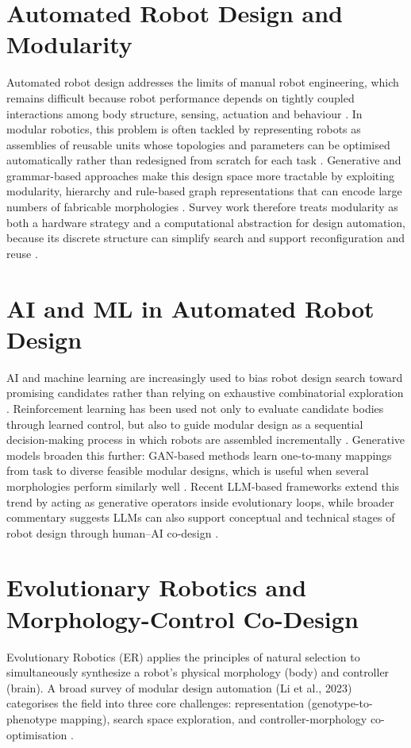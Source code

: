 \documentclass[12pt,a4paper]{report}
\begin{document}
\section{Automated Robot Design and Modularity}
Automated robot design addresses the limits of manual robot engineering, which remains difficult because robot performance depends on tightly coupled interactions among body structure, sensing, actuation and behaviour \citep{matthews2023efficient,park2021computational}. In modular robotics, this problem is often tackled by representing robots as assemblies of reusable units whose topologies and parameters can be optimised automatically rather than redesigned from scratch for each task \citep{li2023modular,hu2022modular}. Generative and grammar-based approaches make this design space more tractable by exploiting modularity, hierarchy and rule-based graph representations that can encode large numbers of fabricable morphologies \citep{hornby2003generative,zhao2020robogrammar}. Survey work therefore treats modularity as both a hardware strategy and a computational abstraction for design automation, because its discrete structure can simplify search and support reconfiguration and reuse \citep{li2023modular,alattas2019evolutionary}.

\section{AI and ML in Automated Robot Design}
AI and machine learning are increasingly used to bias robot design search toward promising candidates rather than relying on exhaustive combinatorial exploration \citep{qiu2024robomorph,11003187}. Reinforcement learning has been used not only to evaluate candidate bodies through learned control, but also to guide modular design as a sequential decision-making process in which robots are assembled incrementally \citep{qiu2024robomorph,park2021computational}. Generative models broaden this further: GAN-based methods learn one-to-many mappings from task to diverse feasible modular designs, which is useful when several morphologies perform similarly well \citep{hu2022modular}. Recent LLM-based frameworks extend this trend by acting as generative operators inside evolutionary loops, while broader commentary suggests LLMs can also support conceptual and technical stages of robot design through human--AI co-design \citep{qiu2024robomorph,stella2023can}.

\section{Evolutionary Robotics and Morphology-Control Co-Design}
Evolutionary Robotics (ER) applies the principles of natural selection to simultaneously synthesize a robot's physical morphology (body) and controller (brain). A broad survey of modular design automation (Li et al., 2023) categorises the field into three core challenges: representation (genotype-to-phenotype mapping), search space exploration, and controller-morphology co-optimisation \citep{li2023modular}.
\end{document}
